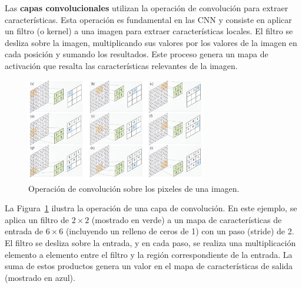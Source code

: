 \documentclass[11pt,spanish,listoffigures,listoftables]{tfgetsinf}
\begin{document}
Las \textbf{capas convolucionales} utilizan la operación de convolución para extraer características. Esta operación es fundamental en las CNN y consiste en aplicar un filtro (o kernel) a una imagen para extraer características locales. El filtro se desliza sobre la imagen, multiplicando sus valores por los valores de la imagen en cada posición y sumando los resultados. Este proceso genera un mapa de activación que resalta las características relevantes de la imagen.  

\begin{figure}[H]
   \centering
   \includegraphics[width=0.7\textwidth]{images/estado_del_arte/operacion_convolucion.png}
   \caption{Operación de convolución sobre los pixeles de una imagen.}
   \label{fig:operacion_convolucion}
\end{figure}

La Figura~\ref{fig:operacion_convolucion}\cite{khan2018guide} ilustra la operación de una capa de convolución. En este ejemplo, se aplica un filtro de $2 \times 2$ (mostrado en verde) a un mapa de características de entrada de $6 \times 6$ (incluyendo un relleno de ceros de 1) con un paso (stride) de 2. El filtro se desliza sobre la entrada, y en cada paso, se realiza una multiplicación elemento a elemento entre el filtro y la región correspondiente de la entrada. La suma de estos productos genera un valor en el mapa de características de salida (mostrado en azul).
\end{document}
